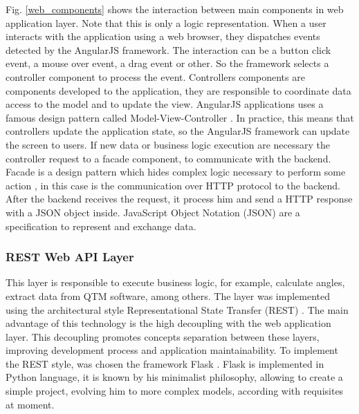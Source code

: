\documentclass[journal]{IEEEtran}
\begin{document}
Fig. \ref{web_components} shows the interaction between  main components in web application layer.
Note that this is only a logic representation.
When a user interacts with the application using a web browser, they dispatches events detected by the 
AngularJS framework. The interaction can be a button click event, a mouse over event, a drag event or
other. So the framework selects a controller component to process the event.
Controllers components are components developed to the application, they are responsible to coordinate
data access to the model and to update the view. 
AngularJS applications uses a famous design pattern called Model-View-Controller \cite{Fowler2002}. 
In practice, this means that controllers update the application state, so the AngularJS framework
can update the screen to users.
If new data or business logic execution are necessary the controller request to a facade component,
to communicate with the backend. 
Facade is a design pattern which hides complex logic necessary to perform some action \cite{Fowler2002}, 
in this case is the communication over HTTP protocol to the backend.
After the backend receives the request, it process him and send a HTTP response with a JSON object inside.
JavaScript Object Notation (JSON) are a specification to represent and exchange data.

\subsubsection{REST Web API Layer}
\label{rest_web_api_layer}

This layer is responsible to execute business logic, for example,
calculate angles, extract data   from QTM software, among others.
The layer was implemented using the architectural style Representational State Transfer (REST) 
\cite{Grinberg2014}.
The main advantage of this technology is the high decoupling with the web application layer.
This decoupling promotes concepts separation between these layers, improving development process
and application maintainability.
To implement the REST style, was chosen the framework Flask \cite{Maia2015}.
Flask is implemented in Python language, it is known by his minimalist philosophy, 
allowing to create a simple project, evolving him to more complex models, according with
requisites at moment.
\end{document}
